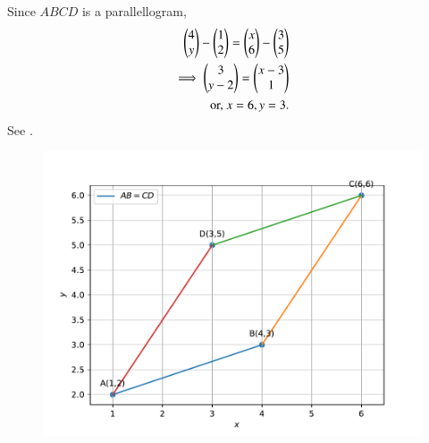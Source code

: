 Since $ABCD$ is a parallellogram,
\begin{align}
  \label{eq:chapters/10/7/2/6/tables/det2f}
 \begin{pmatrix}4 \\y \end{pmatrix} - \begin{pmatrix}1 \\2 \end{pmatrix}  
= \begin{pmatrix}x \\6 \end{pmatrix} - \begin{pmatrix}3 \\5 \end{pmatrix}  
\\
\implies	\begin{pmatrix}3\\y-2\end{pmatrix}=\begin{pmatrix}x-3\\1\end{pmatrix}\\
	\text{ or, }x=6 ,y=3.
\end{align}
See  .
\begin{figure}[h!]
	\begin{center}
  \includegraphics[width=\columnwidth]{chapters/10/7/2/6/figs/para.pdf}
	\end{center}
\caption{}
\label{fig:chapters/10/7/2/6/Fig3}
\end{figure}


